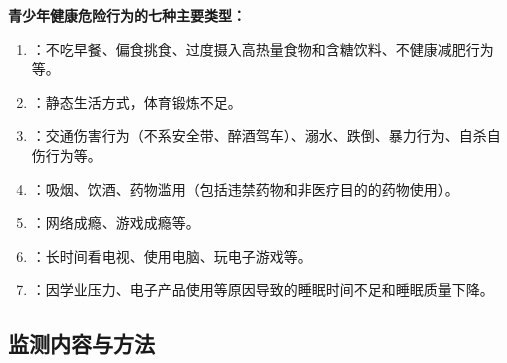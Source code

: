 \begin{keybox}
\textbf{青少年健康危险行为的七种主要类型：}

\begin{enumerate}[leftmargin=*]
    \item {}：不吃早餐、偏食挑食、过度摄入高热量食物和含糖饮料、不健康减肥行为等。
    \item {}：静态生活方式，体育锻炼不足。
    \item {}：交通伤害行为（不系安全带、醉酒驾车）、溺水、跌倒、暴力行为、自杀自伤行为等。
    \item {}：吸烟、饮酒、药物滥用（包括违禁药物和非医疗目的的药物使用）。
    \item {}：网络成瘾、游戏成瘾等。
    \item {}：长时间看电视、使用电脑、玩电子游戏等。
    \item {}：因学业压力、电子产品使用等原因导致的睡眠时间不足和睡眠质量下降。
\end{enumerate}
\end{keybox}

\subsection{监测内容与方法}

